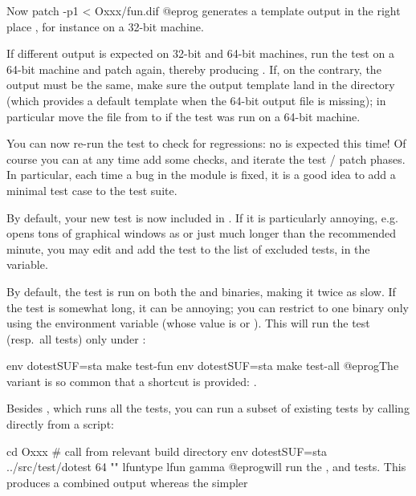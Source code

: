 \item Now
\bprog
  patch -p1 < Oxxx/fun.dif
@eprog\noindent
generates a template output in the right place , for
instance on a 32-bit machine.

\item If different output is expected on 32-bit and 64-bit machines, run the
test on a 64-bit machine and patch again, thereby
producing . If, on the contrary, the output must be the
same, make sure the output template land in the  directory
(which provides a default template when the 64-bit output file is missing);
in particular move the file from  to 
if the test was run on a 64-bit machine.

\item You can now re-run the test to check for regressions: no \kbd{[BUG]}
is expected this time! Of course you can at any time add some checks, and
iterate the test / patch phases. In particular, each time a bug in the
 module is fixed, it is a good idea to add a minimal test case to
the test suite.

\item By default, your new test is now included in . If
it is particularly annoying, e.g. opens tons of graphical windows as
 or just much longer than the recommended minute, you
may edit  and add the  test to the list of
excluded tests, in the  variable.

\item By default, the test is run on both the  and 
binaries, making it twice as slow. If the test is somewhat long, it can
be annoying; you can restrict to one binary only using the 
environment variable (whose value is  or ). This will run
the test (resp.~all tests) only under :

\bprog
  env dotestSUF=sta make test-fun
  env dotestSUF=sta make test-all
@eprog\noindent The  variant is so common that a shortcut
is provided: .

\item Besides , which runs all the tests, you can run a
subset of existing tests by calling  directly from a script:

\bprog
  cd Oxxx     # call from relevant build directory
  env dotestSUF=sta ../src/test/dotest 64 "" lfuntype lfun gamma
@eprog\noindent will run the ,  and  tests.
This produces a combined output whereas the simpler

